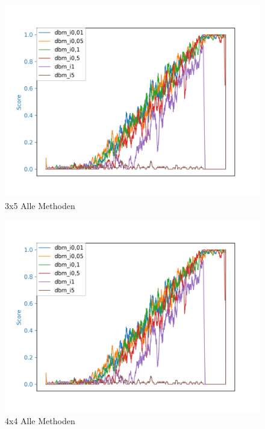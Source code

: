 \begin{figure}[H]
\centering
\includegraphics[width=\textwidth]{Figures/dbm9_4x4_dbm_i0,01_dbm_i0,05_dbm_i0,1_dbm_i0,5_dbm_i1_dbm_i5.png}
\caption{3x5 Alle Methoden}
\label{all_3}
\end{figure}

\begin{figure}[H]
\centering
\includegraphics[width=\textwidth]{Figures/dbm9_4x4_dbm_i0,01_dbm_i0,05_dbm_i0,1_dbm_i0,5_dbm_i1_dbm_i5.png}
\caption{4x4 Alle Methoden}
\label{all_4}
\end{figure}

